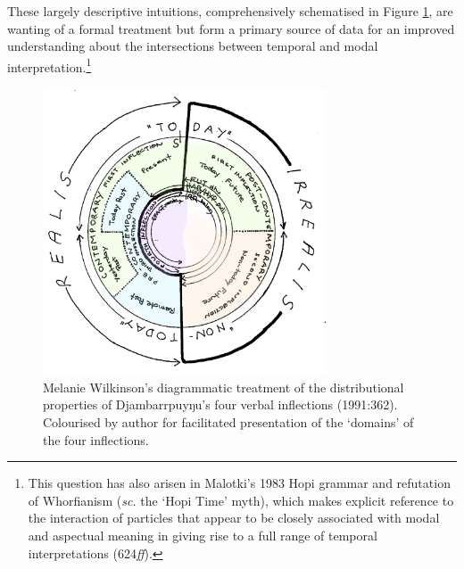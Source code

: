 \documentclass[12pt]{article}
\begin{document}
These largely descriptive intuitions, comprehensively schematised in Figure \ref{wilk}, are wanting of a formal treatment but form a primary source of data for an improved understanding about the intersections between temporal and modal interpretation.\footnote{This question has also arisen in Malotki's 1983 Hopi grammar and refutation of Whorfianism (\textit{sc.} the `Hopi Time' myth), which makes explicit reference to the interaction of particles that appear to be closely associated with modal and aspectual meaning in giving rise to a full range of temporal interpretations (624\textit{ff}).}





\begin{figure}[h]\centering
\caption{Melanie Wilkinson's diagrammatic treatment of the distributional properties of Djambarrpuyŋu's four verbal inflections (1991:362). Colourised by author for facilitated presentation of the `domains' of the four inflections.} \label{wilk}\includegraphics[width=0.75\textwidth]{WilkinsonDiagram362Col}
\end{figure}
\end{document}
